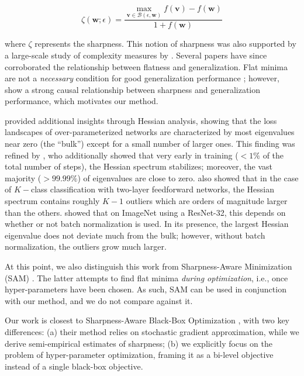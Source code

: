 \documentclass[preprint,12pt]{elsarticle}
\begin{document}
\begin{equation}
\zeta(\boldsymbol w; \epsilon) = \frac{\max\limits_{\boldsymbol v \in \mathcal{B}(\epsilon, \boldsymbol w)} f(\boldsymbol v) - f(\boldsymbol w)}{1 + f(\boldsymbol w)} \label{eq:keskar}
\end{equation}

where $\zeta$ represents the sharpness. This notion of sharpness was also supported by a large-scale study of complexity measures by \citet{jiang2019fantastic}. Several papers \cite{neyshabur2017exploring, li2018visualizing, wu2023implicit} have since corroborated the relationship between flatness and generalization. Flat minima are not a \textit{necessary} condition for good generalization performance \cite{wen2023sharpness, dinh2017sharp}; however, \citet{jiang2019fantastic} show a strong causal relationship between sharpness and generalization performance, which motivates our method. 

\citet{sagun_empirical_2018} provided additional insights through Hessian analysis, showing that the loss landscapes of over-parameterized networks are characterized by most eigenvalues near zero (the ``bulk'') except for a small number of larger ones. This finding was refined by \citet{ghorbani_investigation_2019}, who additionally showed that very early in training ($< 1\%$ of the total number of steps), the Hessian spectrum stabilizes; moreover, the vast majority ($> 99.99\%$) of eigenvalues are close to zero. \citet{sagun_empirical_2018} also showed that in the case of $K-$class classification with two-layer feedforward networks, the Hessian spectrum contains roughly $K-1$ outliers which are orders of magnitude larger than the others. \citet{ghorbani_investigation_2019} showed that on ImageNet using a ResNet-32, this depends on whether or not batch normalization \cite{ioffe_batch_2015} is used. In its presence, the largest Hessian eigenvalue does not deviate much from the bulk; however, without batch normalization, the outliers grow much larger.


At this point, we also distinguish this work from Sharpness-Aware Minimization (SAM) \cite{foret2020sharpness}. The latter attempts to find flat minima \textit{during optimization}, i.e., once hyper-parameters have been chosen. As such, SAM can be used in conjunction with our method, and we do not compare against it.

Our work is closest to Sharpness-Aware Black-Box Optimization \cite{ye_sharpness-aware_2025}, with two key differences: (a) their method relies on stochastic gradient approximation, while we derive semi-empirical estimates of sharpness; (b) we explicitly focus on the problem of hyper-parameter optimization, framing it as a bi-level objective instead of a single black-box objective.
\end{document}
